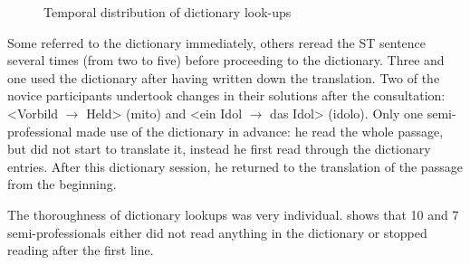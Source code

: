 \documentclass[output=paper]{langsci/langscibook.cls}
\begin{document}
\begin{figure}
 \caption{Temporal distribution of dictionary look-ups}
 \label{kloster:fig:7}
\end{figure}

Some referred to the dictionary immediately, others reread the ST sentence several times (from two to five) before proceeding to the dictionary. Three  and one  used the dictionary after having written down the translation. Two of the novice participants undertook changes in their solutions after the consultation: \textsf{<Vorbild $\rightarrow$ Held> (mito)} and \textsf{<ein Idol $\rightarrow$ das Idol> (idolo).} Only one semi- professional made use of the dictionary in advance: he read the whole passage, but did not start to translate it, instead he first read through the dictionary entries. After this dictionary session, he returned to the translation of the passage from the beginning. 

\newpage
The thoroughness of dictionary lookups was very individual.  shows that 10  and 7 semi-professionals either did not read anything in the dictionary or stopped reading after the first line. 
\end{document}
